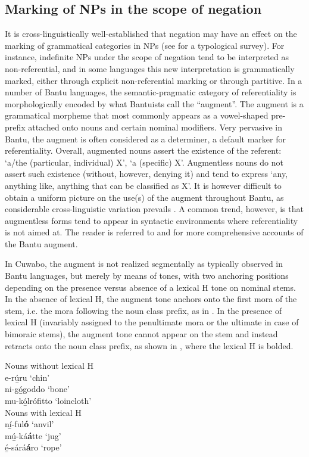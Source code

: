 \documentclass[output=paper,colorlinks=true, citecolor=brown,draftmode]{langscibook}
\begin{document}
\subsection{Marking of NPs in the scope of negation}\label{sec:cuw:4.3}
It is cross-linguistically well-established that negation may have an effect on the marking of grammatical categories in NPs (see \citealt{Miestamo2014} for a typological survey). For instance, indefinite NPs under the scope of negation tend to be interpreted as non-referential, and in some languages this new interpretation is grammatically marked, either through explicit non-referential marking or through partitive. In a number of Bantu languages, the semantic-pragmatic category of referentiality is morphologically encoded by what Bantuists call the “augment”. The augment is a grammatical morpheme that most commonly appears as a vowel-shaped pre-prefix attached onto nouns and certain nominal modifiers. Very pervasive in Bantu, the augment is often considered as a determiner, a default marker for referentiality. Overall, augmented nouns assert the existence of the referent: ‘a/the (particular, individual) X’, ‘a (specific) X’. Augmentless nouns do not assert such existence (without, however, denying it) and tend to express ‘any, anything like, anything that can be classified as X’. It is however difficult to obtain a uniform picture on the use(s) of the augment throughout Bantu, as considerable cross-linguistic variation prevails \citep{Velde2019}. A common trend, however, is that augmentless forms tend to appear in syntactic environments where referentiality is not aimed at. The reader is referred to \citet{Blois1970} and \citet{Velde2019} for more comprehensive accounts of the Bantu augment.

In Cuwabo, the augment is not realized segmentally as typically observed in Bantu languages, but merely by means of tones, with two anchoring positions depending on the presence versus absence of a lexical H tone on nominal stems. In the absence of lexical H, the augment tone anchors onto the first mora of the stem, i.e. the mora following the noun class prefix, as in . In the presence of lexical H (invariably assigned to the penultimate mora or the ultimate in case of bimoraic stems), the augment tone cannot appear on the stem and instead retracts onto the noun class prefix, as shown in , where the lexical H is bolded. 

\ea\label{ex:cuw:70}
    \ea\label{ex:cuw:70a} Nouns without lexical H \\
    e-r{ú̲}ru \tab ‘chin’ \\
    ni-g{ó̲}goddo  \tab ‘bone’ \\
    mu-k{ó̲}lrófitto  \tab ‘loincloth’ \\
    \ex\label{ex:cuw:70b} Nouns with lexical H \\
    n{í̲}{}-ful\textbf{ó} \tab  ‘anvil’\\
    m{ú̲}{}-ká\textbf{á}tte \tab  ‘jug’\\
    {é̲}{}-sárá\textbf{á}ro \tab ‘rope’\\
    \z 
\z 
\end{document}
